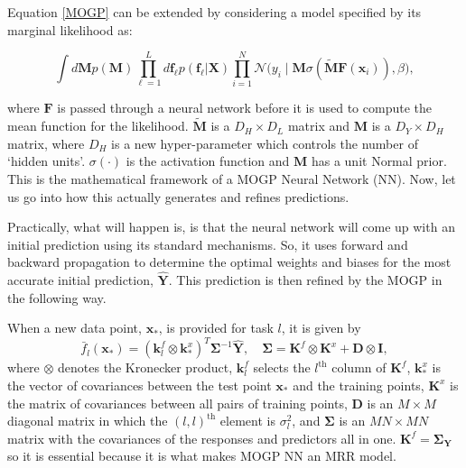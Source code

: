 Equation \ref{MOGP} can be extended by considering a model specified by its marginal likelihood as:

\begin{equation}
\int d\mathbf{M} p(\mathbf{M}) 
\prod_{\ell=1}^{L} d\boldsymbol{f}_\ell p(\boldsymbol{f}_\ell | \mathbf{X}) 
\prod_{i=1}^{N} \mathcal{N} \big(y_i \mid \mathbf{M} \sigma (\widetilde{\mathbf{M}} \mathbf{F} (\mathbf{x}_i)), \beta \big),
\label{MOGP NN}
\end{equation}

\noindent where $\mathbf{F}$ is passed through a neural network before it is used to compute the mean function for the likelihood.\cite{jankowiak2019neural} $\widetilde{\mathbf{M}}$ is a $D_H \times D_L$ matrix and $\mathbf{M}$ is a $D_Y\times D_H$ matrix, where $D_H$ is a new hyper-parameter which controls the number of `hidden units'.\cite{jankowiak2019neural} $\sigma(\cdot)$ is the activation function and $\mathbf{M}$ has a unit Normal prior. This is the mathematical framework of a MOGP Neural Network (NN). Now, let us go into how this actually generates and refines predictions.


Practically, what will happen is, is that the neural network will come up with an initial prediction using its standard mechanisms. So, it uses forward and backward propagation to determine the optimal weights and biases for the most accurate initial prediction, $\mathbf{\hat{Y}}$. This prediction is then refined by the MOGP in the following way.

When a new data point, \(\mathbf{x}_*\), is provided for task \( l \), it is given by
\[
\bar{f}_l(\mathbf{x}_*) = \left( \mathbf{k}_l^f \otimes \mathbf{k}_*^x \right)^T \mathbf{\Sigma}^{-1} \mathbf{\hat{Y}},\quad
\mathbf{\Sigma} = \mathbf{K}^f \otimes \mathbf{K}^x + \mathbf{D \otimes I},
\]
\noindent where \(\otimes\) denotes the Kronecker product, \(\mathbf{k}_l^f\) selects the \(l^{\text{th}}\) column of \( \mathbf{K}^f \), \(\mathbf{k}_*^x\) is the vector of covariances between the test point \(\mathbf{x}_*\) and the training points, \( \mathbf{K}^x \) is the matrix of covariances between all pairs of training points, \( \mathbf{D} \) is an \( M \times M \) diagonal matrix in which the \((l,l)^{\text{th}}\) element is \( \sigma_l^2 \), and \( \mathbf{\Sigma} \) is an \( MN \times MN \) matrix with the covariances of the responses and predictors all in one.\cite{bonilla2007multi}
$\mathbf{K}^f= \mathbf{\Sigma_Y}$ so it is essential because it is what makes MOGP NN an MRR model. 

